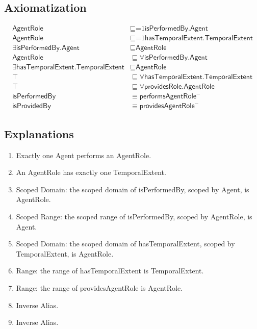 \subsection{Axiomatization}
\label{axs:AgentRole}
\begin{align}
\textsf{AgentRole} &\sqsubseteq \text{=1}\textsf{isPerformedBy.Agent} \\
\textsf{AgentRole} &\sqsubseteq \text{=1}\textsf{hasTemporalExtent.TemporalExtent} \\
\exists\textsf{isPerformedBy.Agent} &\sqsubseteq \textsf{AgentRole} \\
\textsf{AgentRole} &\sqsubseteq \forall\textsf{isPerformedBy.Agent} \\
\exists\textsf{hasTemporalExtent.TemporalExtent} &\sqsubseteq \textsf{AgentRole} \\
\top &\sqsubseteq \forall\textsf{hasTemporalExtent.TemporalExtent} \\
\top &\sqsubseteq \forall\textsf{providesRole.AgentRole} \\
\textsf{isPerformedBy} &\equiv \textsf{performsAgentRole}^- \\
\textsf{isProvidedBy} &\equiv \textsf{providesAgentRole}^-
\end{align}

\subsection{Explanations}
\label{exp:AgentRole}
\begin{enumerate}
\item Exactly one \textsf{Agent} performs an \textsf{AgentRole}.
\item An \textsf{AgentRole} has exactly one \textsf{TemporalExtent}.
\item Scoped Domain: the scoped domain of \textsf{isPerformedBy}, scoped by \textsf{Agent}, is \textsf{AgentRole}.
\item Scoped Range: the scoped range of \textsf{isPerformedBy}, scoped by \textsf{AgentRole}, is \textsf{Agent}. 
\item Scoped Domain: the scoped domain of \textsf{hasTemporalExtent}, scoped by \textsf{TemporalExtent}, is \textsf{AgentRole}.
\item Range: the range of \textsf{hasTemporalExtent} is \textsf{TemporalExtent}.
\item Range:  the range of \textsf{providesAgentRole} is \textsf{AgentRole}.
\item Inverse Alias.
\item Inverse Alias.
\end{enumerate}


